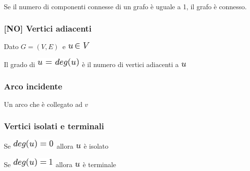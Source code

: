 \documentclass{article}
\begin{document}
{Se il numero di componenti connesse di un grafo è uguale a 1, }{il
grafo è connesso.}

\hypertarget{h.5nknzat57p06}{\subsubsection{\texorpdfstring{{{[}NO{]}
Vertici adiacenti}}{{[}NO{]} Vertici adiacenti}}\label{h.5nknzat57p06}}

{Dato }$G=(V,E)${~e
}\includegraphics{images/image357.png}

{Il grado di }\includegraphics{images/image358.png}{~è il numero di
vertici adiacenti a }\includegraphics{images/image103.png}

\hypertarget{h.52hqmabofvh0}{\subsubsection{\texorpdfstring{{Arco
incidente}}{Arco incidente}}\label{h.52hqmabofvh0}}

{Un arco che è collegato ad }$v$

\hypertarget{h.vm6z084zc6rf}{\subsubsection{\texorpdfstring{{Vertici
isolati e
terminali}}{Vertici isolati e terminali}}\label{h.vm6z084zc6rf}}

{Se }\includegraphics{images/image359.png}{~allora
}\includegraphics{images/image103.png}{~è isolato}

{Se }\includegraphics{images/image360.png}{~allora
}\includegraphics{images/image103.png}{~è terminale}
\end{document}
